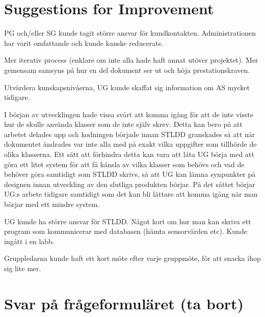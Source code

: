 \documentclass[a4paper]{article}
\begin{document}
\section{Suggestions for Improvement}

PG och/eller SG kunde tagit större ansvar för kundkontakten. Administrationen har varit omfattande och kunde kanske reducerats.

Mer iterativ process (enklare om inte alla hade haft annat utöver projektet). Mer gemensam samsyns på hur en del dokument ser ut och höja prestationskraven.

Utvärdera kunskapsnivåerna, UG kunde skaffat sig information om AS mycket tidigare.

I början av utvecklingen hade vissa svårt att komma igång för att de inte visste hur de skulle använda klasser som de inte själv skrev. Detta kan bero på att arbetet delades upp och kodningen började innan STLDD granskades så att när dokumentet ändrades var inte alla med på exakt vilka uppgifter som tillhörde de olika klasserna. Ett sätt att förhindra detta kan vara att låta UG börja med att göra ett litet system för att få känsla av vilka klasser som behövs och vad de behöver göra samtidigt som STLDD skrivs, så att UG kan lämna synpunkter på designen innan utveckling av den slutliga produkten börjar. På det sättet börjar UG:s arbete tidigare samtidigt som det kan bli lättare att komma igång när man börjar med ett mindre system.


UG kunde ha större ansvar för STLDD. Något kort om hur man kan skriva ett program som kommunicerar med databasen (hämta sensorvärden etc). Kunde ingått i en labb.

Gruppledarna kunde haft ett kort möte efter varje gruppmöte, för att snacka ihop sig lite mer. 

\section{Svar på frågeformuläret (ta bort)}



\end{document}
